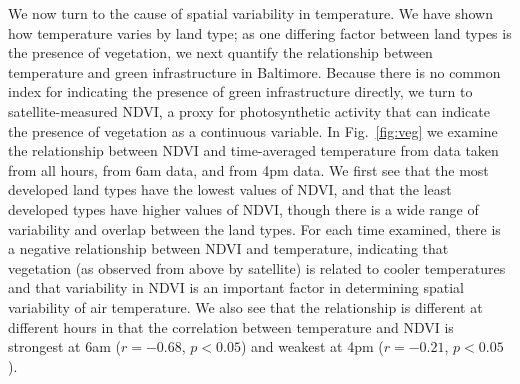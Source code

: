 \documentclass[draft,linenumbers]{agujournal}
\begin{document}
We now turn to the cause of spatial variability in temperature. We have shown how temperature varies by land type; as one differing factor between land types is the presence of vegetation, we next quantify the relationship between temperature and green infrastructure in Baltimore. 
Because there is no common index for indicating the presence of green infrastructure directly, we turn to satellite-measured NDVI, a proxy for photosynthetic activity that can indicate the presence of vegetation as a continuous variable. 
In Fig.~\ref{fig:veg} we examine the relationship between NDVI and time-averaged temperature from data taken from all hours, from 6am data, and from 4pm data. We first see that the most developed land types have the lowest values of NDVI, and that the least developed types have higher values of NDVI, though there is a wide range of variability and overlap between the land types. For each time examined, there is a negative relationship between NDVI and temperature, indicating that vegetation (as observed from above by satellite) is related to cooler temperatures and  that variability in NDVI is an important factor in determining spatial variability of air temperature. We also see that the relationship is different at different hours in that the correlation between temperature and NDVI is strongest at 6am ($r = -0.68$, $p< 0.05$) and weakest at 4pm ($r= -0.21$, $p<0.05$). 
\end{document}
